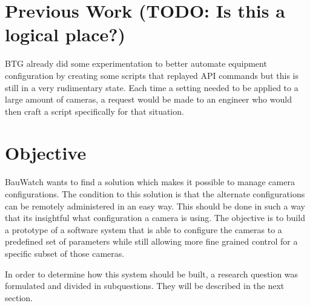 % 

\section{Previous Work (TODO: Is this a logical place?)}
BTG already did some experimentation to better automate equipment configuration by creating some scripts that replayed API commands but this is still
in a very rudimentary state. Each time a setting needed to be applied to a large amount of cameras, a request would be made to an engineer who would then craft a script
specifically for that situation.

\section{Objective}
BauWatch wants to find a solution which makes it possible to manage camera configurations.
The condition to this solution is that the alternate configurations can be remotely administered in an easy way.
This should be done in such a way that its insightful what configuration a camera is using.
The objective is to build a prototype of a software system that is able to configure the cameras to a predefined set of parameters while still allowing
more fine grained control for a specific subset of those cameras.

In order to determine how this system should be built, a research question was formulated and divided in subquestions. They will be described in the next section.



